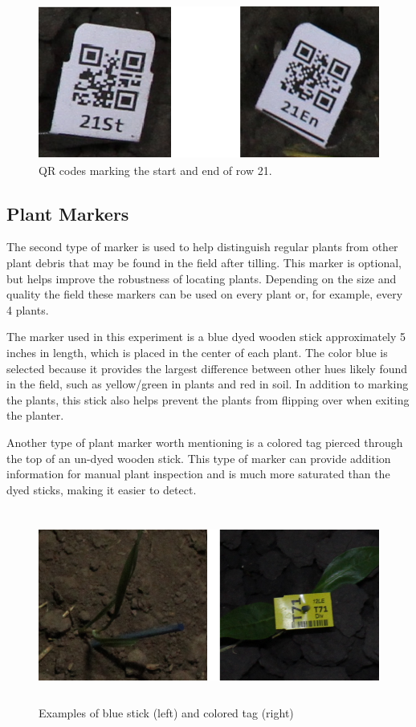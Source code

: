 \begin{figure}[htb]
	\centering
    \includegraphics[height=2in]{figures/row_codes.png}
    \caption[Row QR codes]{QR codes marking the start and end of row 21.}
    \label{figure:row_codes}
\end{figure}

\subsection{Plant Markers}
\label{section:plant_markers}

The second type of marker is used to help distinguish regular plants from other plant debris that may be found in the field after tilling.  This marker is optional, but helps improve the robustness of locating plants.  Depending on the size and quality the field these markers can be used on every plant or, for example, every 4 plants. 

The marker used in this experiment is a blue dyed wooden stick approximately 5 inches in length, which is placed in the center of each plant. The color blue is selected because it provides the largest difference between other hues likely found in the field, such as yellow/green in plants and red in soil.  In addition to marking the plants, this stick also helps prevent the plants from flipping over when exiting the planter.

Another type of plant marker worth mentioning is a colored tag pierced through the top of an un-dyed wooden stick.  This type of marker can provide addition information for manual plant inspection and is much more saturated than the dyed sticks, making it easier to detect. 

\begin{figure}[htb]
	\centering
    \includegraphics[height=2.5in]{figures/plant_markers.png}
    \caption[Plant markers]{Examples of blue stick (left) and colored tag (right)}
    \label{figure:plant_markers}
\end{figure}
